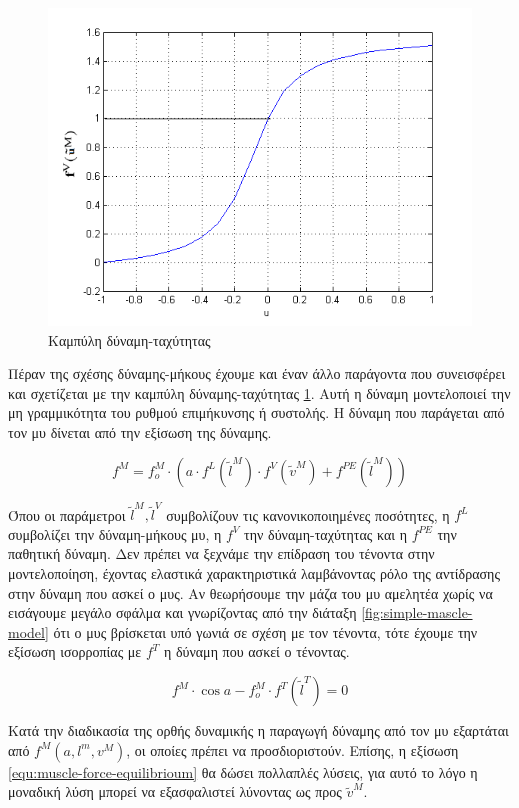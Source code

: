 \begin{figure}[H]
    \centering
    \includegraphics[width=.6\textwidth]{musculoskeletal/fig/force-velocity.png}
    \caption{Καμπύλη δύναμη-ταχύτητας}
    \label{fig:force-velocity}
\end{figure}

Πέραν της σχέσης δύναμης-μήκους έχουμε και έναν άλλο παράγοντα που συνεισφέρει και σχετίζεται με την καμπύλη δύναμης-ταχύτητας \ref{fig:force-velocity}. Αυτή η δύναμη μοντελοποιεί την μη γραμμικότητα του ρυθμού επιμήκυνσης ή συστολής. Η δύναμη που παράγεται από τον μυ δίνεται από την εξίσωση της δύναμης.

\begin{equation}
    f^{M} = f^{M}_{o} \cdot (a \cdot f^{L}(\tilde{l}^{M}) \cdot f^{V}(\tilde{v}^{M}) + f^{PE}(\tilde{l}^{M}))
    \label{equ:muscle-force}
\end{equation}

Όπου οι παράμετροι $\tilde{l}^{M}, \tilde{l}^{V}$ συμβολίζουν τις κανονικοποιημένες ποσότητες, η $f^{L}$ συμβολίζει την δύναμη-μήκους μυ, η $f^{V}$ την δύναμη-ταχύτητας και η $f^{PE}$ την παθητική δύναμη. Δεν πρέπει να ξεχνάμε την επίδραση του τένοντα στην μοντελοποίηση, έχοντας ελαστικά χαρακτηριστικά λαμβάνοντας ρόλο της αντίδρασης στην δύναμη που ασκεί ο μυς. Αν θεωρήσουμε την μάζα του μυ αμελητέα χωρίς να εισάγουμε μεγάλο σφάλμα και γνωρίζοντας από την διάταξη \ref{fig:simple-mascle-model} ότι ο μυς βρίσκεται υπό γωνιά  σε σχέση με τον τένοντα, τότε έχουμε την εξίσωση ισορροπίας με $f^{T}$ η δύναμη που ασκεί ο τένοντας.

\begin{equation}
    f^{M} \cdot \cos{a} - f^{M}_{o} \cdot f^{T}(\tilde{l}^{T}) = 0
    \label{equ:muscle-force-equilibrioum}
\end{equation}

Κατά την διαδικασία της ορθής δυναμικής η παραγωγή δύναμης από τον μυ εξαρτάται από $f^{M}(a, l^{m}, v^{M})$, οι οποίες πρέπει να προσδιοριστούν. Επίσης, η εξίσωση \ref{equ:muscle-force-equilibrioum} θα δώσει πολλαπλές λύσεις, για αυτό το λόγο η μοναδική λύση μπορεί να εξασφαλιστεί λύνοντας ως προς $\tilde{v}^{M}$.

